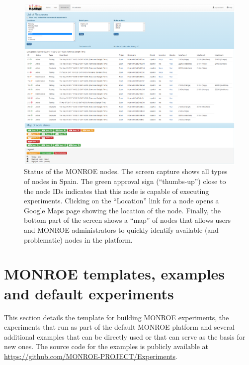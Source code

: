 \documentclass[a4paper,10pt]{article}
\newcommand{\monroe}{MONROE}
\begin{document}
\begin{figure}[tp]
	\centering
	\includegraphics[width=1\textwidth]{Resources.png}
	\caption{Status of the \monroe{} nodes. The screen capture shows all types of nodes in Spain. The green approval sign (``thumbs-up'') close to the node IDs indicates that this node is capable of executing experiments. Clicking on the ``Location'' link for a node opens a Google Maps page showing the location of the node. Finally, the bottom part of the screen shows a ``map'' of nodes that allows users and \monroe{} administrators to quickly identify available (and problematic) nodes in the platform.}
	\label{fig:Resources}
\end{figure}



\section{\monroe{} templates, examples and default experiments}
\label{sec:examples}

This section details the template for building \monroe{} experiments, the experiments that run as part of the default \monroe{} platform and several additional examples that can be directly used or that can serve as the basis for new ones.
The source code for the examples is publicly available at \url{https://github.com/MONROE-PROJECT/Experiments}.
\end{document}
